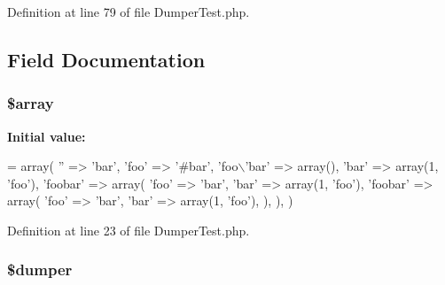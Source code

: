 Definition at line 79 of file Dumper\+Test.\+php.



\subsection{Field Documentation}
\subsubsection[{\$array}]{\setlength{\rightskip}{0pt plus 5cm}\$array\hspace{0.3cm}{\ttfamily [protected]}}\label{class_symfony_1_1_component_1_1_yaml_1_1_tests_1_1_dumper_test_ac1361b8d873c1f927b21b809f99e5752}
{\bfseries Initial value\+:}
\begin{DoxyCode}
= array(
        \textcolor{stringliteral}{''} => \textcolor{stringliteral}{'bar'},
        \textcolor{stringliteral}{'foo'} => \textcolor{stringliteral}{'#bar'},
        \textcolor{stringliteral}{'foo\(\backslash\)'bar'} => array(),
        \textcolor{stringliteral}{'bar'} => array(1, \textcolor{stringliteral}{'foo'}),
        \textcolor{stringliteral}{'foobar'} => array(
            \textcolor{stringliteral}{'foo'} => \textcolor{stringliteral}{'bar'},
            \textcolor{stringliteral}{'bar'} => array(1, \textcolor{stringliteral}{'foo'}),
            \textcolor{stringliteral}{'foobar'} => array(
                \textcolor{stringliteral}{'foo'} => \textcolor{stringliteral}{'bar'},
                \textcolor{stringliteral}{'bar'} => array(1, \textcolor{stringliteral}{'foo'}),
            ),
        ),
    )
\end{DoxyCode}


Definition at line 23 of file Dumper\+Test.\+php.

\subsubsection[{\$dumper}]{\setlength{\rightskip}{0pt plus 5cm}\$dumper\hspace{0.3cm}{\ttfamily [protected]}}\label{class_symfony_1_1_component_1_1_yaml_1_1_tests_1_1_dumper_test_a6b5e16ac66fbfbc3d002d97555af1920}


